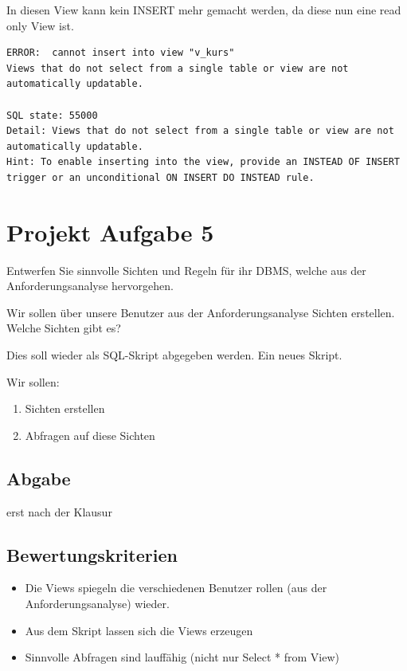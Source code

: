 \documentclass[a4paper]{article}
\begin{document}
In diesen View kann kein INSERT mehr gemacht werden, da diese nun eine read only View ist.

\begin{lstlisting}
ERROR:  cannot insert into view "v_kurs"
Views that do not select from a single table or view are not automatically updatable. 

SQL state: 55000
Detail: Views that do not select from a single table or view are not automatically updatable.
Hint: To enable inserting into the view, provide an INSTEAD OF INSERT trigger or an unconditional ON INSERT DO INSTEAD rule.
\end{lstlisting}

\newpage
{}

\section{Projekt Aufgabe 5}

Entwerfen Sie sinnvolle Sichten und Regeln für ihr DBMS, welche aus der Anforderungsanalyse hervorgehen.

Wir sollen über unsere Benutzer aus der Anforderungsanalyse Sichten erstellen. Welche Sichten gibt es?

Dies soll wieder als SQL-Skript abgegeben werden. Ein neues Skript.

Wir sollen:

\begin{enumerate}
    \item Sichten erstellen
    \item Abfragen auf diese Sichten
\end{enumerate}

\subsection{Abgabe}

erst nach der Klausur

\subsection{Bewertungskriterien}

\begin{itemize}
    \item Die Views spiegeln die verschiedenen Benutzer rollen (aus der Anforderungsanalyse) wieder.
    \item Aus dem Skript lassen sich die Views erzeugen
    \item Sinnvolle Abfragen sind lauffähig (nicht nur Select * from View)
\end{itemize}
\end{document}
